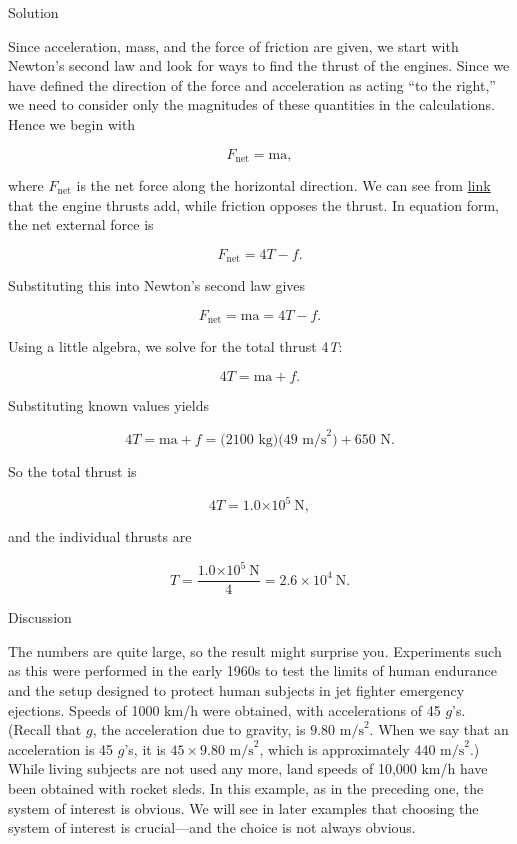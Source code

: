 \documentclass[
]{book}
\begin{document}
{Solution}

Since acceleration, mass, and the force of friction are given, we start
with Newton's second law and look for ways to find the thrust of the
engines. Since we have defined the direction of the force and
acceleration as acting ``to the right,'' we need to consider only the
magnitudes of these quantities in the calculations. Hence we begin with

\leavevmode{}%
\[{F_{\text{net}} = \text{ma}},\]

where \(F_{\text{net}}{}\) is the net force along the horizontal
direction. We can see from \protect\hyperlink{fs-id2407992}{link}
that the engine thrusts add, while friction opposes the thrust. In
equation form, the net external force is

\leavevmode{}%
\[{F_{\text{net}} = {4T - f}}.\]

Substituting this into Newton's second law gives

\leavevmode{}%
\[{{F_{\text{net}} = \text{ma}} = {4T - f}}.\]

Using a little algebra, we solve for the total thrust 4\emph{T}:

\leavevmode{}%
\[{4T = {\text{ma} + f}}.\]

Substituting known values yields

\leavevmode{}%
\[{{{4T = {\text{ma} + f}} = (}\text{2100\ kg})(\text{49\ m/s}^{2}{) + \text{650\ N}}}.\]

So the total thrust is

\leavevmode{}%
\[{{4T = 1.0}{\times \text{10}^{5}}\ \text{N}},\]

and the individual thrusts are

\leavevmode{}%
\[{{{T = \frac{1.0{\times \text{10}^{5}}\ \text{N}}{4}} = 2.6 \times \text{10}^{4}}\ \text{N}}.\]

{Discussion}

The numbers are quite large, so the result might surprise you.
Experiments such as this were performed in the early 1960s to test the
limits of human endurance and the setup designed to protect human
subjects in jet fighter emergency ejections. Speeds of 1000 km/h were
obtained, with accelerations of 45 \(g{}\)'s. (Recall that \(g{}\), the
acceleration due to gravity, is \({9\text{.}\text{80\ m/s}^{2}}{}\). When
we say that an acceleration is 45 \(g{}\)'s, it is
\({\text{45}\times 9\text{.}\text{80\ m/s}^{2}}{}\), which is
approximately \(\text{440\ m/s}^{2}{}\).) While living subjects are not
used any more, land speeds of 10,000 km/h have been obtained with rocket
sleds. In this example, as in the preceding one, the system of interest
is obvious. We will see in later examples that choosing the system of
interest is crucial---and the choice is not always obvious.
\end{document}
